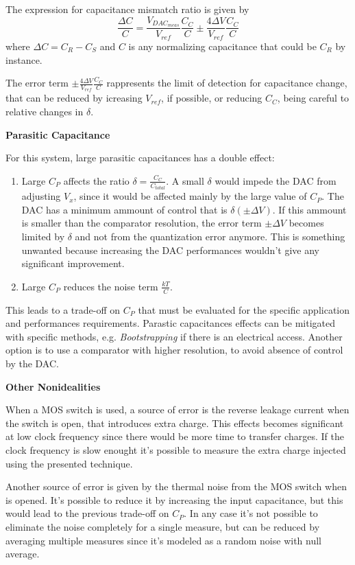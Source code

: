 The expression for capacitance mismatch ratio is given by
\[\frac{\Delta C}{C} = \frac{V_{DAC_{meas}}}{V_{ref}}\frac{C_C}{C} \pm \frac{4\Delta V}{V_{ref}}\frac{C_C}{C}\]
where $\Delta C = C_R - C_S$ and $C$ is any normalizing capacitance that could be $C_R$ by instance.

The error term $\pm \frac{4\Delta V}{V_{ref}}\frac{C_C}{C}$ rappresents the limit of detection for capacitance change, that can be reduced by icreasing $V_{ref}$, if possible, or reducing $C_C$, being careful to relative changes in $\delta$.

\textbf{Parasitic Capacitance}

For this system, large parasitic capacitances has a double effect:
\begin{enumerate}
	\item Large $C_P$ affects the ratio $\delta= \frac{C_C}{C_{total}}$. A small $\delta$ would impede the DAC from adjusting $V_x$, since it would be affected mainly by the large value of $C_P$. The DAC has a minimum ammount of control that is $\delta (\pm \Delta V)$. If this ammount is smaller than the comparator resolution, the error term $\pm\Delta V$ becomes limited by $\delta$ and not from the quantization error anymore. This is something unwanted because increasing the DAC performances wouldn't give any significant improvement.
	\item Large $C_P$ reduces the noise term $\frac{kT}{C}$.
\end{enumerate}
This leads to a trade-off on $C_P$ that must be evaluated for the specific application and performances requirements. Parastic capacitances effects can be mitigated with specific methods, e.g. \textit{Bootstrapping} if there is an electrical access. Another option is to use a comparator with higher resolution, to avoid absence of control by the DAC.

\textbf{Other Nonidealities}

When a MOS switch is used, a source of error is the reverse leakage current when the switch is open, that introduces extra charge. This effects becomes significant at low clock frequency since there would be more time to transfer charges. If the clock frequency is slow enought it's possible to measure the extra charge injected using the presented technique.

Another source of error is given by the thermal noise from the MOS switch when is opened. It's possible to reduce it by increasing the input capacitance, but this would lead to the previous trade-off on $C_P$. In any case it's not possible to eliminate the noise completely for a single measure, but can be reduced by averaging multiple measures since it's modeled as a random noise with null average.